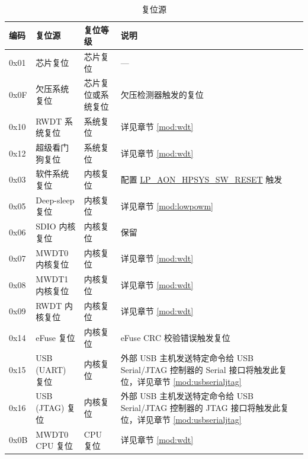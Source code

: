 \documentclass[main\_\_CN.tex]{subfiles}
\begin{document}
\begin{table}[H]
    \centering
    \caption{复位源}
    \label{tab:resclk-reset-src}
    \begin{threeparttable}
    \begin{tabular}{ |l|m{3.5cm}|m{1.8cm}|m{9.2cm}| }
    \hline
\rowcolor{lightgray}
\textbf{编码} & \textbf{复位源} & \textbf{复位等级} &   \textbf{说明} \\\hline
        0x01 & 芯片复位\tnote{1} & 芯片复位 & ---\\
        \hline
        0x0F & 欠压系统复位 & 芯片复位或系统复位 & 欠压检测器触发的复位\tnote{2}\\
        \hline
        0x10 & RWDT 系统复位 & 系统复位 & 详见章节 \ref{mod:wdt} \textit{\nameref{mod:wdt}}
        \\\hline
        0x12 & 超级看门狗复位 & 系统复位 & 详见章节 \ref{mod:wdt} \textit{\nameref{mod:wdt}}
        \\\hline
        0x03 & 软件系统复位 & 内核复位 & 配置 \hyperref[fielddesc:LPAONHPSYSSWRESET]{LP\_AON\_HPSYS\_SW\_RESET} 触发\\
        \hline
        0x05 & Deep-sleep 复位 & 内核复位 & 详见章节 \ref{mod:lowpowm} \textit{\nameref{mod:lowpowm}}
        \\\hline
        0x06 & SDIO 内核复位 & 内核复位 & 保留
        \\\hline
        0x07 & MWDT0 内核复位 & 内核复位 & 详见章节 \ref{mod:wdt} \textit{\nameref{mod:wdt}}
        \\\hline
        0x08 & MWDT1 内核复位 & 内核复位 & 详见章节 \ref{mod:wdt} \textit{\nameref{mod:wdt}}
        \\\hline
        0x09 & RWDT 内核复位 & 内核复位 & 详见章节 \ref{mod:wdt} \textit{\nameref{mod:wdt}}
        \\\hline
        0x14 & eFuse 复位 & 内核复位 & eFuse CRC 校验错误触发复位
        \\\hline
        0x15 & USB (UART) 复位 & 内核复位 & 外部 USB 主机发送特定命令给 USB Serial/JTAG 控制器的 Serial 接口将触发此复位，详见章节 \ref{mod:usbserialjtag} \textit{\nameref{mod:usbserialjtag}} \\\hline
        0x16 & USB (JTAG) 复位 & 内核复位 & 外部 USB 主机发送特定命令给 USB Serial/JTAG 控制器的 JTAG 接口将触发此复位，详见章节 \ref{mod:usbserialjtag} \textit{\nameref{mod:usbserialjtag}} \\\hline
        0x0B & MWDT0 CPU 复位 & CPU 复位 & 详见章节 \ref{mod:wdt} \textit{\nameref{mod:wdt}}
        \\\hline

\end{tabular}
\end{threeparttable}
\end{table}
\end{document}
